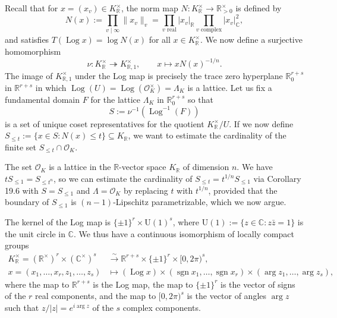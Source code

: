 \documentclass[UTF8,11pt]{ctexart}
\theoremstyle{definition}
\newcommand{\R}{\mathbb R}
\newcommand{\C}{\mathbb C}
\begin{document}
Recall that for $x=(x_v)\in K_\R^\times$, the norm map $N:K_\R^\times\to\R_{>0}^\times$ is defined by
\[
N(x):=\prod_{v\mid\infty}\|x_v\|_v=\prod_{v\text{ real}}|x_v|_\R\prod_{v\text{ complex}}|x_v|_\C^2,
\]
and satisfies $T(\operatorname{Log}x)=\log N(x)$ for all $x\in K_\R^\times$. We now define a surjective homomorphism
\[
\nu:K_\R^\times\twoheadrightarrow K_{\R,1}^\times,\qquad x\mapsto xN(x)^{-1/n}.
\]
The image of $K_{\R,1}^\times$ under the Log map is precisely the trace zero hyperplane $\R^{r+s}_0$ in $\R^{r+s}$ in which $\operatorname{Log}(U)=\operatorname{Log}(\mathcal O_K^\times)=\Lambda_K$ is a lattice. Let us fix a fundamental domain $F$ for the lattice $\Lambda_K$ in $\R^{r+s}_0$ so that
\[
S:=\nu^{-1}(\operatorname{Log}^{-1}(F))
\]
is a set of unique coset representatives for the quotient $K_\R^\times/U$. If we now define $S_{\leq t}:=\{x\in S:N(x)\leq t\}\subseteq K_\R$, we want to estimate the cardinality of the finite set $S_{\leq t}\cap\mathcal O_K$.

The set $\mathcal O_K$ is a lattice in the $\R$-vector space $K_\R$ of dimension $n$. We have $tS_{\leq1}=S_{\leq t^n}$, so we can estimate the cardinality of $S_{\leq t}=t^{1/n}S_{\leq1}$ via Corollary 19.6 with $S=S_{\leq1}$ and $\Lambda=\mathcal O_K$ by replacing $t$ with $t^{1/n}$, provided that the boundary of $S_{\leq1}$ is $(n-1)$-Lipschitz parametrizable, which we now argue.

The kernel of the Log map is $\{\pm1\}^r\times\mathrm U(1)^s$, where $\mathrm U(1):=\{z\in\C:z\bar z=1\}$ is the unit circle in $\C$. We thus have a continuous isomorphism of locally compact groups
\begin{align*}
K_\R^\times=(\R^\times)^r\times(\C^\times)^s&\xrightarrow{\sim}\R^{r+s}\times\{\pm1\}^r\times[0,2\pi)^s,\tag{1}\\
x=(x_1,\ldots,x_r,z_1,\ldots,z_s)&\longmapsto(\operatorname{Log}x)\times(\operatorname{sgn}x_1,\ldots,\operatorname{sgn}x_r)\times(\arg z_1,\ldots,\arg z_s),
\end{align*}
where the map to $\R^{r+s}$ is the Log map, the map to $\{\pm1\}^r$ is the vector of signs of the $r$ real components, and the map to $[0,2\pi)^s$ is the vector of angles $\arg z$ such that $z/|z|=e^{i\arg z}$ of the $s$ complex components.
\end{document}
